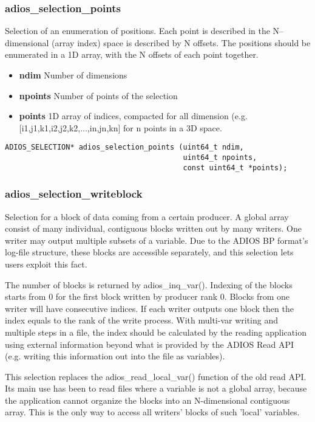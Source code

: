 \subsubsection{adios\_selection\_points}
Selection of an enumeration of positions.
Each point is described in the N--dimensional (array index) space is 
described by N offsets. The positions should be enumerated in a 1D array,
with the N offsets of each point together.

\begin{itemize} 
\item{\bf ndim}      Number of dimensions
\item{\bf npoints}   Number of points of the selection
\item{\bf points}    1D array of indices, compacted for all dimension
(e.g.  [i1,j1,k1,i2,j2,k2,...,in,jn,kn] for n points in a 3D space.
\end{itemize}

\begin{lstlisting}[alsolanguage=C]
ADIOS_SELECTION* adios_selection_points (uint64_t ndim, 
                                         uint64_t npoints, 
                                         const uint64_t *points);
\end{lstlisting}


\subsubsection{adios\_selection\_writeblock}
Selection for a block of data coming from a certain producer.
A global array consist of many individual, contiguous blocks written out by
many writers. One writer may output multiple subsets of a variable. 
Due to the ADIOS BP format's log-file structure, these blocks are accessible 
separately, and this selection lets users exploit this fact. 

The number of blocks is returned by adios\_inq\_var(). 
Indexing of the blocks starts from 0 for the first block
written by producer rank 0. Blocks from one writer will have consecutive indices. 
If each writer outputs one block then the index equals to the rank of the write process. 
With multi-var writing and multiple steps in a file, the index should be
calculated by the reading application using external information beyond
what is provided by the ADIOS Read API 
(e.g. writing this information out into the file as variables).

This selection replaces the adios\_read\_local\_var() function of the old read API. 
Its main use has been to read files where a variable is not a global array, because 
the application cannot organize the blocks into an N-dimensional contiguous array. 
This is the only way to access all writers' blocks of such 'local' variables.

